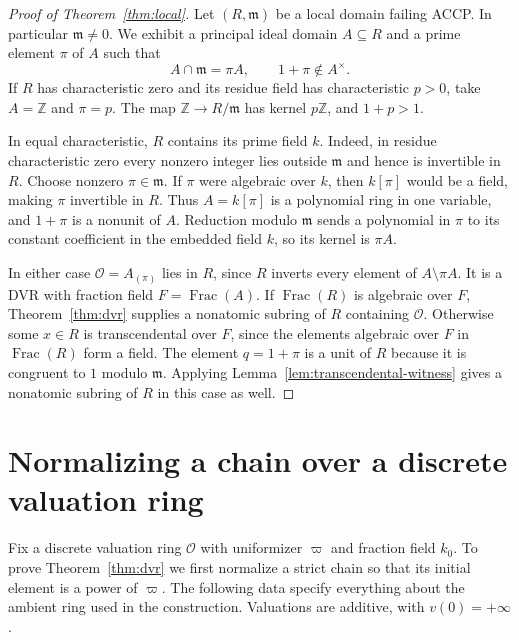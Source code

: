 \documentclass[11pt, letterpaper]{article}
\theoremstyle{definition}
\theoremstyle{remark}
\DeclareMathOperator{\Frac}{Frac}
\begin{document}
\begin{proof}[Proof of Theorem~\ref{thm:local}]
    Let $(R, \mathfrak{m})$ be a local domain failing ACCP.
    In particular $\mathfrak{m} \ne 0$.
    We exhibit a principal ideal domain $A \subseteq R$ and a prime element $\pi$ of $A$ such that
    \[
        A \cap \mathfrak{m} = \pi A,
        \qquad 1 + \pi \notin A^{\times}.
    \]
    If $R$ has characteristic zero and its residue field has characteristic $p > 0$, take $A = \mathbb{Z}$ and $\pi = p$.
    The map $\mathbb{Z} \to R/\mathfrak{m}$ has kernel $p\mathbb{Z}$, and $1 + p > 1$.

    In equal characteristic, $R$ contains its prime field $k$.
    Indeed, in residue characteristic zero every nonzero integer lies outside $\mathfrak{m}$ and hence is invertible in $R$.
    Choose nonzero $\pi \in \mathfrak{m}$.
    If $\pi$ were algebraic over $k$, then $k[\pi]$ would be a field, making $\pi$ invertible in $R$.
    Thus $A = k[\pi]$ is a polynomial ring in one variable, and $1 + \pi$ is a nonunit of $A$.
    Reduction modulo $\mathfrak{m}$ sends a polynomial in $\pi$ to its constant coefficient in the embedded field $k$, so its kernel is $\pi A$.

    In either case $\mathcal{O} = A_{(\pi)}$ lies in $R$, since $R$ inverts every element of $A \setminus \pi A$.
    It is a DVR with fraction field $F = \Frac(A)$.
    If $\Frac(R)$ is algebraic over $F$, Theorem~\ref{thm:dvr} supplies a nonatomic subring of $R$ containing $\mathcal{O}$.
    Otherwise some $x \in R$ is transcendental over $F$, since the elements algebraic over $F$ in $\Frac(R)$ form a field.
    The element $q = 1 + \pi$ is a unit of $R$ because it is congruent to $1$ modulo $\mathfrak{m}$.
    Applying Lemma~\ref{lem:transcendental-witness} gives a nonatomic subring of $R$ in this case as well.
\end{proof}

\section{Normalizing a chain over a discrete valuation ring}
\label{sec:chain}

Fix a discrete valuation ring $\mathcal{O}$ with uniformizer $\varpi$ and fraction field $k_{0}$.
To prove Theorem~\ref{thm:dvr} we first normalize a strict chain so that its initial element is a power of $\varpi$.
The following data specify everything about the ambient ring used in the construction.
Valuations are additive, with $v(0) = +\infty$.
\end{document}
